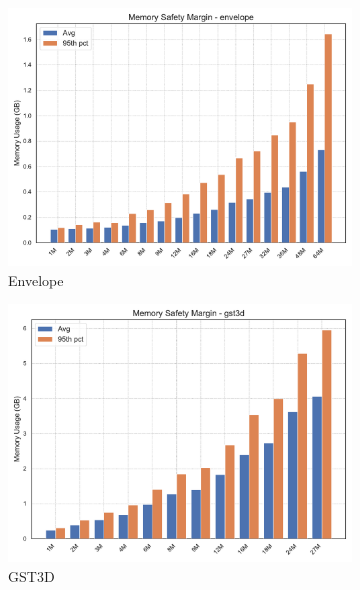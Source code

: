 \begin{figure}[htbp]
    \centering
    \begin{subfigure}[t]{0.32\textwidth}
        \includegraphics[width=\textwidth]{assets/images/05/memory_safety_margin_envelope}
        \caption{Envelope}
    \end{subfigure}
    \hfill
    \begin{subfigure}[t]{0.32\textwidth}
        \includegraphics[width=\textwidth]{assets/images/05/memory_safety_margin_gst3d}
        \caption{\ac{GST3D}}
    \end{subfigure}
    \hfill
    \begin{subfigure}[t]{0.32\textwidth}

\end{subfigure}
\end{figure}
